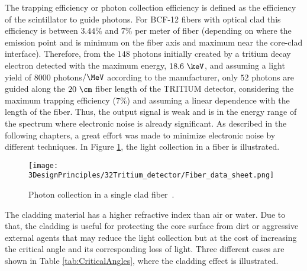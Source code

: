 The trapping efficiency or photon collection efficiency is defined as the efficiency of the scintillator to guide photons. For BCF-12 fibers with optical clad this efficiency is between $3.44\%$ and $7\%$ per meter of fiber (depending on where the emission point and is minimum on the fiber axis  and maximum near the core-clad interface). Therefore, from the $148$ photons initially created by a tritium decay electron detected with the maximum energy, $18.6~\keV$, and assuming a light yield of $8000$ photons$/\MeV$ according to the manufacturer, only $52$ photons are guided along the $20~\cm$ fiber length of the TRITIUM detector, considering the maximum trapping efficiency ($7\%$) and assuming a linear dependence with the length of the fiber. Thus, the output signal is weak and is in the energy range of the spectrum where electronic noise is already significant. As described in the following chapters, a great effort was made to minimize electronic noise by different techniques. In Figure \ref{fig:Fiber_physic}, the light collection in a fiber is illustrated.

\begin{figure}[htbp]
\centering
\texttt{[image: 3DesignPrinciples/32Tritium\_detector/Fiber\_data\_sheet.png]}
\caption{Photon collection in a single clad fiber\label{fig:Fiber_physic}~\cite{DataSheetBCF12Fiber}.}
\end{figure}
The cladding material has a higher refractive index than air or water. Due to that, the cladding is useful for protecting the core surface from dirt or aggressive external agents that may reduce the light collection but at the cost of increasing the critical angle and its corresponding loss of light. Three different cases are shown in Table \ref{tab:CriticalAngles}, where the cladding effect is illustrated.

